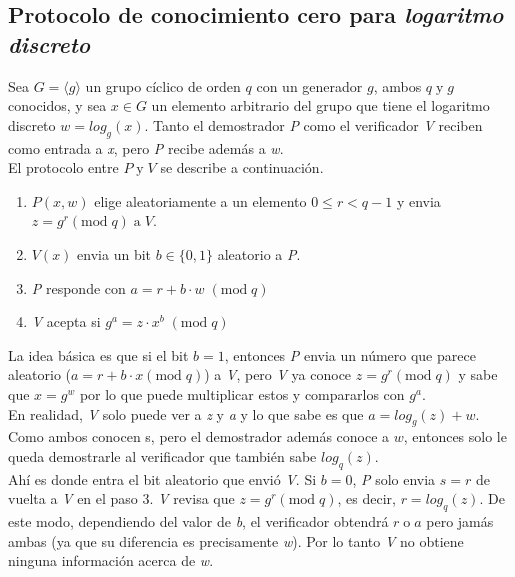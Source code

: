 \documentclass[oneside,10pt]{article}
\begin{document}
\subsection{Protocolo de conocimiento cero para \emph{logaritmo discreto}}\cite{chris-chan}
Sea $G = \langle g \rangle$ un grupo cíclico de orden $q$ con un generador $g$, ambos $q \; \mathrm{y} \; g$ conocidos, y sea $x \in G$ un elemento arbitrario del grupo que tiene el logaritmo discreto $w = log_g(x)$. Tanto el demostrador \emph{P} como el verificador \emph{V} reciben como entrada a \emph{x}, pero \emph{P} recibe además a \emph{w}.\\
El protocolo entre $P \; \mathrm{y} \; V$ se describe a continuación.
\begin{enumerate}
\item $P(x,w)$ elige aleatoriamente a un elemento $ 0 \leq r < q-1$ y envia $z = g^r (\mathrm{mod}\; q) \; \mathrm{a} \; V$.
\item $V(x)$ envia un bit  $b \in \{0,1\}$ aleatorio a \emph{P}. 
\item \emph{P} responde con $a = r + b \cdot w \;(\mathrm{mod}\; q)$
\item \emph{V} acepta si $g^a = z \cdot x^b \;(\mathrm{mod}\; q)$
\end{enumerate}
La idea básica es que si el bit $b = 1$, entonces \emph{P} envia un número que parece aleatorio ($a = r + b \cdot x (\mathrm{mod}\; q)$) a \emph{V}, pero \emph{V} ya conoce $z = g^r (\mathrm{mod}\; q)$ y sabe que $x = g^w$ por lo que puede multiplicar estos y compararlos con $g^a$. \\
En realidad, \emph{V} solo puede ver a \emph{z} y \emph{a} y lo que sabe es que $a = log_g(z) + w$. Como ambos conocen s, pero el demostrador además conoce a $w$, entonces solo le queda demostrarle al verificador que también sabe $log_q(z)$. \\
Ahí es donde entra el bit aleatorio que envió \emph{V}. Si $b=0$, \emph{P} solo envia $s=r$ de vuelta a \emph{V} en el paso 3. \emph{V} revisa que $z=g^r (\mathrm{mod}\; q)$, es decir, $r = log_q(z)$. De este modo, dependiendo del valor de \emph{b}, el verificador obtendrá $r \; \mathrm{o} \; a$ pero jamás ambas (ya que su diferencia es precisamente \emph{w}). Por lo tanto \emph{V} no obtiene ninguna información acerca de \emph{w}.
\end{document}
